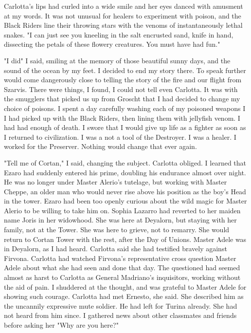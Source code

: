 \documentclass{article}
\begin{document}
Carlotta's lips had curled into a wide smile and her eyes danced with amusment at my words. It was not unusual for healers to experiment with poison, and the Black Riders line their throwing stars with the venoms of instantaneously lethal snakes. "I can just see you kneeling in the salt encrusted sand, knife in hand, dissecting the petals of these flowery creatures. You must have had fun."

"I did" I said, smiling at the memory of those beautiful sunny days, and the sound of the ocean by my feet. I decided to end my story there. To speak further would come dangerously close to telling the story of the fire and our flight from Szarvis. There were things, I found, I could not tell even Carlotta. It was with the smugglers that picked us up from Groscht that I had decided to change my choice of poisons. I spent a day carefully washing each of my poisoned weapons I I had picked up with the Black Riders, then lining them with jellyfish venom. I had had enough of death. I swore that I would give up life as a fighter as soon as I returned to civilization. I was a not a tool of the Destroyer. I was a healer. I worked for the Preserver. Nothing would change that ever again.

"Tell me of Cortan," I said, changing the subject. Carlotta obliged. I learned that Ezaro had suddenly entered his prime, doubling his endurance almost over night. He was no longer under Master Alerio's tutelage, but working with Master Cheppe, an older man who would never rise above his position as the boy's Head in the tower. Ezaro had been too openly curious about the wild magic for Master Alerio to be willing to take him on. Sophia Lazarro had reverted to her maiden name Joris in her widowhood. She was here at Deyalorn, but staying with her family, not at the Tower. She was here to grieve, not to remarry. She would return to Cortan Tower with the rest, after the Day of Unions. Master Adele was in Deyalorn, as I had heard. Carlotta said she had testified bravely against Firvona. Carlotta had watched Firvona's representative cross question Master Adele about what she had seen and done that day. The questioned had seemed almost as harst to Carlotta as General Madriano's inquisitors, working without the aid of pain. I shuddered at the thought, and was grateful to Master Adele for showing such courage. Carlotta had met Ernesto, she said. She described him as the uncannily expressive mute soldier. He had left for Turina already. She had not heard from him since. I gathered news about other classmates and friends before asking her "Why are you here?"
\end{document}
